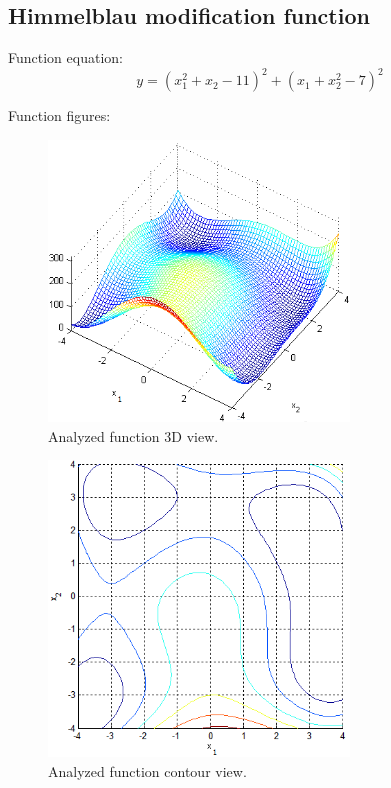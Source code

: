 \documentclass[12pt]{article}
\begin{document}
\subsection{Himmelblau modification function}
Function equation:
\begin{equation}
	y=(x_1^2+x_2-11)^2 +(x_1+x_2^2-7)^2
\end{equation}

Function figures:
\begin{figure}[H]
	\begin{center}
		\includegraphics[width=8cm]{himm.png}
		\caption{Analyzed function 3D view.}
	\end{center}
\end{figure}
\begin{figure}[H]
	\begin{center}
		\includegraphics[width=8cm]{himm_count.png}
		\caption{Analyzed function contour view.}
	\end{center}
\end{figure}
\end{document}
